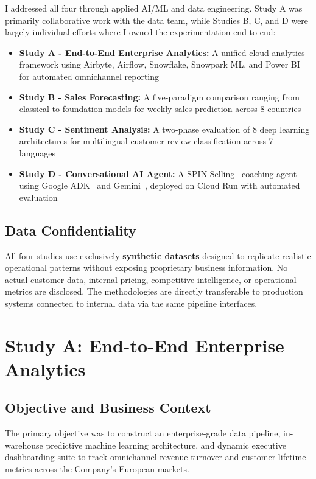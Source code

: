 \documentclass[11pt,a4paper]{article}
\begin{document}
I addressed all four through applied AI/ML and data engineering. Study A was primarily collaborative work with the data team, while Studies B, C, and D were largely individual efforts where I owned the experimentation end-to-end:
\begin{itemize}[leftmargin=*,noitemsep,topsep=2pt]
    \item \textbf{Study A - End-to-End Enterprise Analytics:} A unified cloud analytics framework using Airbyte, Airflow, Snowflake, Snowpark ML, and Power BI for automated omnichannel reporting
    \item \textbf{Study B - Sales Forecasting:} A five-paradigm comparison ranging from classical to foundation models for weekly sales prediction across 8 countries
    \item \textbf{Study C - Sentiment Analysis:} A two-phase evaluation of 8 deep learning architectures for multilingual customer review classification across 7 languages
    \item \textbf{Study D - Conversational AI Agent:} A SPIN Selling~\cite{rackham1988spin} coaching agent using Google ADK~\cite{googleadk2024} and Gemini~\cite{gemini2024}, deployed on Cloud Run with automated evaluation
\end{itemize}

\subsection{Data Confidentiality}
All four studies use exclusively \textbf{synthetic datasets} designed to replicate realistic operational patterns without exposing proprietary business information. No actual customer data, internal pricing, competitive intelligence, or operational metrics are disclosed. The methodologies are directly transferable to production systems connected to internal data via the same pipeline interfaces.

\section{Study A: End-to-End Enterprise Analytics}

\subsection{Objective and Business Context}
The primary objective was to construct an enterprise-grade data pipeline, in-warehouse predictive machine learning architecture, and dynamic executive dashboarding suite to track omnichannel revenue turnover and customer lifetime metrics across the Company's European markets.
\end{document}
